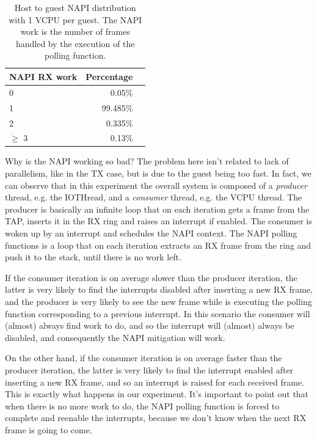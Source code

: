 \begin{table}
\begin{center}
\begin{tabular}{lrl}
\toprule
\textbf{NAPI RX work} & \textbf{Percentage}\\
\midrule
0 & 0.05\%\\
1 & 99.485\%\\
2 & 0.335\%\\
$\geq$ 3 & 0.13\%\\
\bottomrule
\end{tabular}
\end{center}
\caption{Host to guest NAPI distribution with 1 VCPU per guest. The NAPI work is the number of
frames handled by the execution of the polling function.}
\label{tab:e1000-rx-napi-dist}
\end{table}

Why is the NAPI working so bad? The problem here isn't related to lack of parallelism, like in the TX case, but is due to the guest being
too fast. In fact, we can observe that in this experiment the overall system is composed of a \emph{producer} thread, e.g. the IOTHread,
and a \emph{consumer} thread, e.g. the VCPU thread. The producer is basically an infinite loop that on each iteration gets a frame from the
TAP, inserts it in the RX ring and raises an interrupt if enabled. The consumer is woken up by an interrupt and schedules the NAPI context.
The NAPI polling functions is a loop that on each iteration extracts an RX frame from the ring and push it to the stack, until there is no
work left.

If the consumer iteration is on average slower than the producer iteration, the latter is very likely to find the interrupts disabled
after inserting a new RX frame, and the producer is very likely to see the new frame while is executing the polling function corresponding
to a previous interrupt. In this scenario the consumer will (almost) always find work to do, and so the interrupt will (almost) always
be disabled, and consequently the NAPI mitigation will work.

On the other hand, if the consumer iteration is on average faster than the producer iteration, the latter is very likely to find the
interrupt enabled after inserting a new RX frame, and so an interrupt is raised for each received frame. This is exactly what happens
in our experiment. It's important to point out that when there is no more work to do, the NAPI polling function is forced to complete 
and reenable the interrupts, because we don't know when the next RX frame is going to come.

